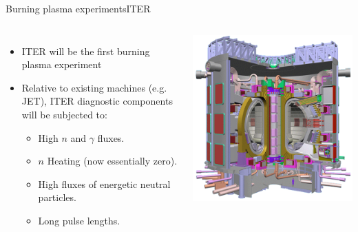 \documentclass{beamer}
\begin{document}
\begin{frame}{Burning plasma experiments}{ITER}
	\begin{columns}
  		\begin{itemize}
			\item ITER will be the first burning plasma experiment 
			\item Relative to existing machines (e.g. JET), ITER diagnostic components will be subjected to:
			\begin{itemize}
				\item High $n$ and $\gamma$ fluxes.
				\item $n$ Heating (now essentially zero).
				\item High fluxes of energetic neutral particles.
				\item Long pulse lengths.
			\end{itemize}
		\end{itemize}			
			\begin{center}
				\includegraphics[width=0.8  \columnwidth]{ITER.png}
			\end{center}
 	 \end{columns}  	
\end{frame}
\end{document}

